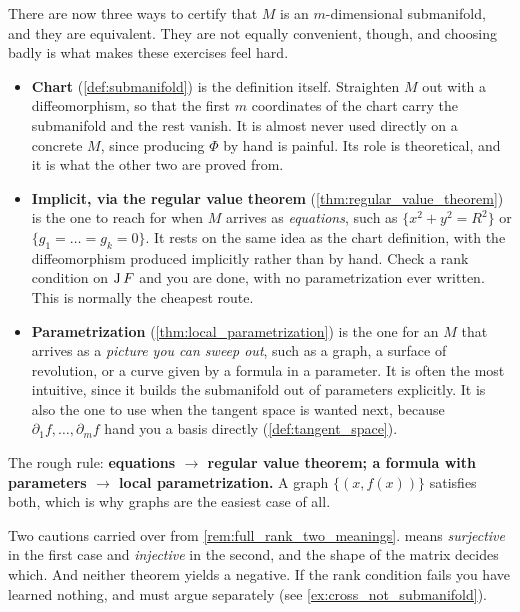 \begin{remark}
\label{rem:three_submanifold_descriptions}
There are now three ways to certify that $M$ is an $m$-dimensional submanifold, and they are
equivalent. They are not equally convenient, though, and choosing badly is what makes these
exercises feel hard.

\begin{itemize}
  \item \textbf{Chart} (\cref{def:submanifold}) is the definition itself. Straighten $M$ out
    with a diffeomorphism, so that the first $m$ coordinates of the chart carry the submanifold
    and the rest vanish. It is almost never used directly on a concrete $M$, since producing
    $\Phi$ by hand is painful. Its role is theoretical, and it is what the other two are proved
    from.
  \item \textbf{Implicit, via the regular value theorem} (\cref{thm:regular_value_theorem}) is
    the one to reach for when $M$ arrives as \emph{equations}, such as $\{x^2+y^2=R^2\}$ or
    $\{g_1=\dots=g_k=0\}$. It rests on the same idea as the chart definition, with the
    diffeomorphism produced implicitly rather than by hand. Check a rank condition on $\operatorname{J} F$
    and you are done, with no parametrization ever written. This is normally the cheapest route.
  \item \textbf{Parametrization} (\cref{thm:local_parametrization}) is the one for an $M$ that
    arrives as a \emph{picture you can sweep out}, such as a graph, a surface of revolution, or
    a curve given by a formula in a parameter. It is often the most intuitive, since it builds
    the submanifold out of parameters explicitly. It is also the one to use when the tangent
    space is wanted next, because $\partial_1f,\dots,\partial_mf$ hand you a basis directly
    (\cref{def:tangent_space}).
\end{itemize}

The rough rule: \textbf{equations $\to$ regular value theorem; a formula with parameters $\to$
local parametrization.} A graph $\{(x,f(x))\}$ satisfies both, which is why graphs are the
easiest case of all.

Two cautions carried over from \cref{rem:full_rank_two_meanings}.  means
\emph{surjective} in the first case and \emph{injective} in the second, and the shape of the
matrix decides which. And neither theorem yields a negative. If the rank condition fails you
have learned nothing, and must argue separately (see \cref{ex:cross_not_submanifold}).
\end{remark}

